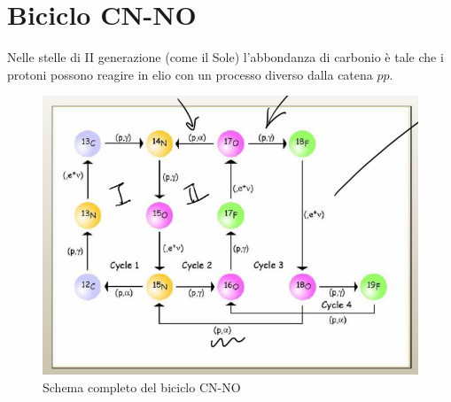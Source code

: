 \newpage
\section{Biciclo CN-NO}\label{sec-CNNO}
Nelle stelle di II generazione (come il Sole) l'abbondanza di carbonio è tale che i protoni possono reagire in elio con un processo diverso dalla catena $pp$.
\begin{figure}[!h]
	\centering
	\includegraphics[scale=0.6]{Immagini/0422_CNO-complete-scheme.png}
	\caption{Schema completo del biciclo CN-NO}
	\label{0422_completescheme}
\end{figure}

